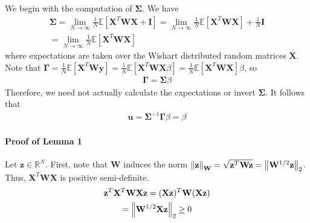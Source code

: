\documentclass[mnsc,blindrev]{informs3}
\begin{document}
                We begin with the computation of $\mathbf{\Sigma}$. We have
                \begin{gather*}
                    \mathbf{\Sigma} = \lim_{N\rightarrow \infty} \frac{1}{N}\mathds{E}[\mathbf{X}^T \mathbf{W} \mathbf{X} + \mathbf{I}] 
                    = \lim_{N\rightarrow \infty} \frac{1}{N}\mathds{E}[\mathbf{X}^T \mathbf{W} \mathbf{X}] + \frac{1}{N} \mathbf{I} \\
                    = \lim_{N\rightarrow \infty} \frac{1}{N}\mathds{E}[\mathbf{X}^T \mathbf{W} \mathbf{X}]
                \end{gather*}
                where expectations are taken over the Wishart distributed random matrices $\mathbf{X}$.
                Note that $\mathbf{\Gamma} = \frac{1}{N}\mathds{E}[\mathbf{X}^T \mathbf{W} \mathbf{y}]=\frac{1}{N}\mathds{E}[\mathbf{X}^T \mathbf{W} \mathbf{X} \beta]=\frac{1}{N}\mathds{E}[\mathbf{X}^T \mathbf{W} \mathbf{X}] \beta$, so 
                \begin{gather*}
                    \mathbf{\Gamma} = \mathbf{\Sigma} \beta  
                \end{gather*}
        Therefore, we need not actually calculate the expectations or invert $\mathbf{\Sigma}$. It follows that
        \begin{gather*}
            \mathbf{u} = \mathbf{\Sigma}^{-1} \mathbf{\Gamma} \beta = \beta
        \end{gather*}
     
    
        \paragraph{Proof of Lemma 1}
            Let $\mathbf{z} \in \mathbb{R}^N$. First, note that $\mathbf{W}$ induces the norm $\norm{\mathbf{z}}_\mathbf{W} = \sqrt{\mathbf{z}^T \mathbf{W} \mathbf{z}} = \norm{\mathbf{W}^{1/2}\mathbf{z}}_2$. Thus, $\mathbf{X}^T \mathbf{W} \mathbf{X}$ is positive semi-definite. 
            \begin{gather*}
                \mathbf{z}^T \mathbf{X}^T \mathbf{W} \mathbf{X} \mathbf{z} = (\mathbf{X} \mathbf{z})^T \mathbf{W} (\mathbf{X} \mathbf{z}) \\
                = \norm{\mathbf{W}^{1/2} \mathbf{X}\mathbf{z}}_2 \geq 0
            \end{gather*}
            
\end{document}
